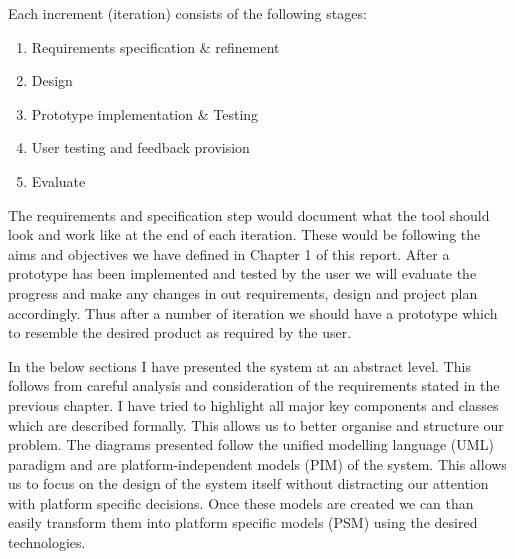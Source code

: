 Each increment (iteration) consists of the following stages:
\begin{enumerate}
	\item Requirements specification \& refinement
	\item Design
	\item Prototype implementation \& Testing
	\item User testing and feedback provision
	\item Evaluate
\end{enumerate}
The requirements and specification step would document what the tool should look and work like at the end of each iteration. These would be following the aims and objectives we have defined in Chapter 1 of this report. After a prototype has been implemented and tested by the user we will evaluate the progress and make any changes in out requirements, design and project plan accordingly. Thus after a number of iteration we should have a prototype which to resemble the desired product as required by the user.

In the below sections I have presented the system at an abstract level. This follows from careful analysis and consideration of the requirements stated in the previous chapter. I have tried to highlight all major key components and classes which are described formally. This allows us to better organise and structure our problem. The diagrams presented follow the unified modelling language (UML) paradigm \cite{uml} and are platform-independent models (PIM) of the system. This allows us to focus on the design of the system itself without distracting our attention with platform specific decisions. Once these models are created we can than easily transform them into platform specific models (PSM) using the desired technologies.

